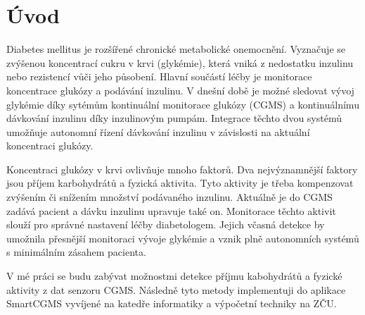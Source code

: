 \chapter{Úvod}

Diabetes mellitus je rozšířené chronické metabolické onemocnění. Vyznačuje se zvýšenou koncentrací cukru v krvi (glykémie), která vniká z nedostatku inzulinu nebo rezistencí vůči jeho působení. Hlavní součástí léčby je monitorace koncentrace glukózy a podávání inzulinu. V dnešní době je možné sledovat vývoj glykémie díky sytémům kontinuální monitorace glukózy (CGMS) a kontinuálnímu dávkování inzulinu díky inzulinovým pumpám. Integrace těchto dvou systémů umožňuje autonomní řízení dávkování inzulinu v závislosti na aktuální koncentraci glukózy.

Koncentraci glukózy v krvi ovlivňuje mnoho faktorů. Dva nejvýznamnější faktory jsou příjem karbohydrátů a fyzická aktivita. Tyto aktivity je třeba kompenzovat zvýšením či snížením množství podávaného inzulinu. Aktuálně je do CGMS zadává pacient a dávku inzulinu upravuje také on. Monitorace těchto aktivit slouží pro správné nastavení léčby diabetologem. Jejich včasná detekce by umožnila přesnější monitoraci vývoje glykémie a vznik plně autonomních systémů s minimálním zásahem pacienta.

V mé práci se budu zabývat možnostmi detekce příjmu kabohydrátů a fyzické aktivity z dat senzoru CGMS. Následně tyto metody implementuji do aplikace SmartCGMS vyvíjené na katedře informatiky a výpočetní techniky na ZČU.